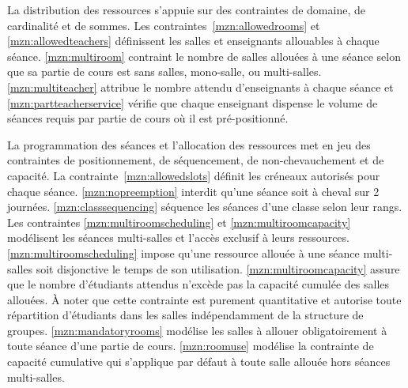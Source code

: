 
La distribution des ressources s'appuie sur des contraintes de domaine, de cardinalité et de sommes.
Les contraintes~\ref{mzn:allowedrooms} et \ref{mzn:allowedteachers} définissent les salles et enseignants allouables à chaque séance.
\ref{mzn:multiroom} contraint le nombre de salles allouées à une séance selon que sa partie de cours est sans salles, mono-salle, ou multi-salles.
\ref{mzn:multiteacher} attribue le nombre attendu d'enseignants à chaque séance
et \ref{mzn:partteacherservice} vérifie que chaque enseignant dispense le volume de séances requis par partie de cours où il est pré-positionné.


La programmation des séances et l'allocation des ressources met en jeu des contraintes de positionnement, de séquencement, de non-chevauchement et de capacité. 
La contrainte~\ref{mzn:allowedslots} définit les créneaux autorisés pour chaque séance.
\ref{mzn:nopreemption} interdit qu'une séance soit à cheval sur 2 journées. 
\ref{mzn:classsequencing} séquence les séances d'une classe selon leur rangs.
Les contraintes \ref{mzn:multiroomscheduling} et \ref{mzn:multiroomcapacity} modélisent les séances multi-salles et l'accès exclusif à leurs ressources.
\ref{mzn:multiroomscheduling} impose qu'une ressource allouée à une séance multi-salles soit disjonctive le temps de son utilisation.
\ref{mzn:multiroomcapacity} assure que le nombre d'étudiants attendus n'excède pas la capacité cumulée des salles allouées.
À noter que cette contrainte est purement quantitative et autorise toute répartition d'étudiants dans les salles indépendamment de la structure de groupes.
\ref{mzn:mandatoryrooms} modélise les salles à allouer obligatoirement à toute séance d'une partie de cours.
\ref{mzn:roomuse} modélise la contrainte de capacité cumulative qui s'applique par défaut à toute salle allouée hors séances multi-salles.

